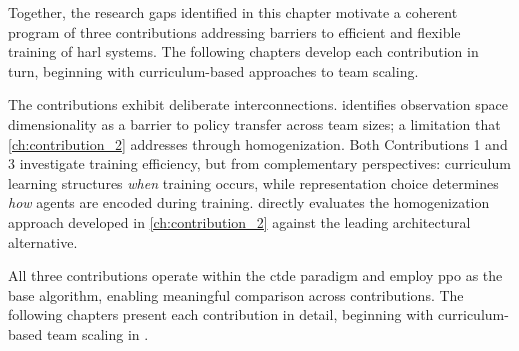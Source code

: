 Together, the research gaps identified in this chapter motivate a 
coherent program of three contributions addressing barriers to 
efficient and flexible training of \gls{harl} systems. The following 
chapters develop each contribution in turn, beginning with 
curriculum-based approaches to team scaling.

The contributions exhibit deliberate interconnections. 
 identifies observation space dimensionality 
as a barrier to policy transfer across team sizes;
a limitation that \cref{ch:contribution_2} addresses through homogenization. 
Both Contributions 1 and 3 investigate training efficiency, 
but from complementary perspectives: curriculum learning structures 
\emph{when} training occurs, while representation choice determines 
\emph{how} agents are encoded during training.  directly 
evaluates the homogenization approach developed in \cref{ch:contribution_2} 
against the leading architectural alternative.

All three contributions operate within the \gls{ctde} 
paradigm and employ \gls{ppo} as the base algorithm, 
enabling meaningful comparison across contributions.
The following chapters present each contribution in detail,
beginning with curriculum-based team scaling in .

